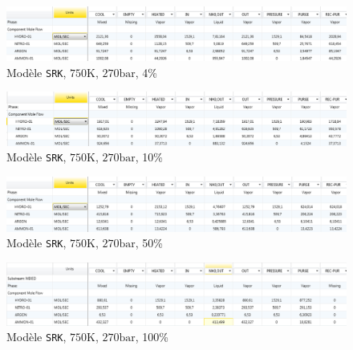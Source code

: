 \begin{figure}[h!]
	\begin{center}
		\includegraphics[scale=0.5]{../tache2/img_aspen/SRK,750,270,4.png}
	\end{center}
	\caption{Modèle \texttt{SRK}, $750\si{\kelvin}$, $270\si{\bar}$, 4\%}
	\label{fig:SRK,750,270,0.04}
\end{figure}

\begin{figure}[h!]
	\begin{center}
		\includegraphics[scale=0.5]{../tache2/img_aspen/SRK,750,270,10.png}
	\end{center}
	\caption{Modèle \texttt{SRK}, $750\si{\kelvin}$, $270\si{\bar}$, 10\%}
	\label{fig:SRK,750,270,0.1}
\end{figure}

\begin{figure}[h!]
	\begin{center}
		\includegraphics[scale=0.5]{../tache2/img_aspen/SRK,750,270,50.png}
	\end{center}
	\caption{Modèle \texttt{SRK}, $750\si{\kelvin}$, $270\si{\bar}$, 50\%}
	\label{fig:SRK,750,270,0.5}
\end{figure}

\begin{figure}[h!]
	\begin{center}
		\includegraphics[scale=0.5]{../tache2/img_aspen/SRK,750,270,100.png}
	\end{center}
	\caption{Modèle \texttt{SRK}, $750\si{\kelvin}$, $270\si{\bar}$, 100\%}
	\label{fig:SRK,750,270,1}
\end{figure}

